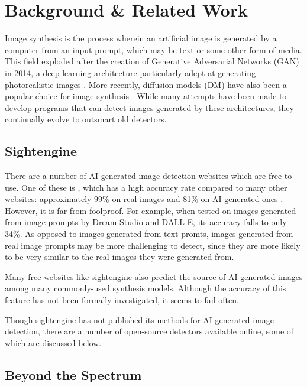 \documentclass{article} %
\begin{document}
\section{Background \& Related Work}
\label{background}

Image synthesis is the process wherein an artificial image is generated by a computer from an input prompt, which may be text or some other form of media. This field exploded after the creation of Generative Adversarial Networks (GAN) in 2014, a deep learning architecture particularly adept at generating photorealistic images \citep{GANfather}. More recently, diffusion models (DM) have also been a popular choice for image synthesis \citep{latent-diffusion}. While many attempts have been made to develop programs that can detect images generated by these architectures, they continually evolve to outsmart old detectors.

\subsection{Sightengine}

There are a number of AI-generated image detection websites which are free to use. One of these is \citet{sightengine}, which has a high accuracy rate compared to many other websites: approximately 99\% on real images and 81\% on AI-generated ones \citep{li2024adversarialaiartunderstandinggeneration}. However, it is far from foolproof. For example, when tested on images generated from image prompts by Dream Studio and DALL-E, its accuracy falls to only 34\%. As opposed to images generated from text promts, images generated from real image prompts may be more challenging to detect, since they are more likely to be very similar to the real images they were generated from.

Many free websites like sightengine also predict the source of AI-generated images among many commonly-used synthesis models. Although the accuracy of this feature has not been formally investigated, it seems to fail often.

Though sightengine has not published its methods for AI-generated image detection, there are a number of open-source detectors available online, some of which are discussed below.

\subsection{Beyond the Spectrum}
\end{document}
